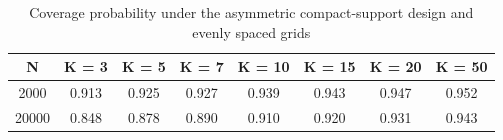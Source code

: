 \begin{table}[!h]
\centering
\caption{\label{tab:coverage_even_compact}Coverage probability under the asymmetric compact-support design and evenly spaced grids}
\centering
\begin{tabular}[t]{cccccccc}
\toprule
N & K = 3 & K = 5 & K = 7 & K = 10 & K = 15 & K = 20 & K = 50\\
\midrule
2000 & 0.913 & 0.925 & 0.927 & 0.939 & 0.943 & 0.947 & 0.952\\
20000 & 0.848 & 0.878 & 0.890 & 0.910 & 0.920 & 0.931 & 0.943\\
\bottomrule
\end{tabular}
\end{table}